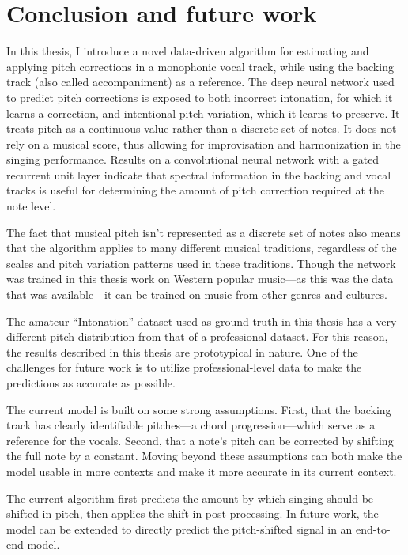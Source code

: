 \chapter{Conclusion and future work}
\label{chap:conclusion}

In this thesis, I introduce a novel data-driven algorithm for estimating and applying pitch corrections in a monophonic vocal track, while using the backing track (also called accompaniment) as a reference. The deep neural network used to predict pitch corrections is exposed to both incorrect intonation, for which it learns a correction, and intentional pitch variation, which it learns to preserve. It treats pitch as a continuous value rather than a discrete set of notes. It does not rely on a musical score, thus allowing for improvisation and harmonization in the singing performance. Results on a convolutional neural network with a gated recurrent unit layer indicate that spectral information in the backing and vocal tracks is useful for determining the amount of pitch correction required at the note level. 

The fact that musical pitch isn't represented as a discrete set of notes also means that the algorithm applies to many different musical traditions, regardless of the scales and pitch variation patterns used in these traditions. Though the network was trained in this thesis work on Western popular music---as this was the data that was available---it can be trained on music from other genres and cultures.

The amateur ``Intonation'' dataset used as ground truth in this thesis has a very different pitch distribution from that of a professional dataset. For this reason, the results described in this thesis are prototypical in nature. One of the challenges for future work is to utilize professional-level data to make the predictions as accurate as possible. 

The current model is built on some strong assumptions. First, that the backing track has clearly identifiable pitches---a chord progression---which serve as a reference for the vocals. Second, that a note's pitch can be corrected by shifting the full note by a constant. Moving beyond these assumptions can both make the model usable in more contexts and make it more accurate in its current context. 

The current algorithm first predicts the amount by which singing should be shifted in pitch, then applies the shift in post processing. In future work, the model can be extended to directly predict the pitch-shifted signal in an end-to-end model. 

